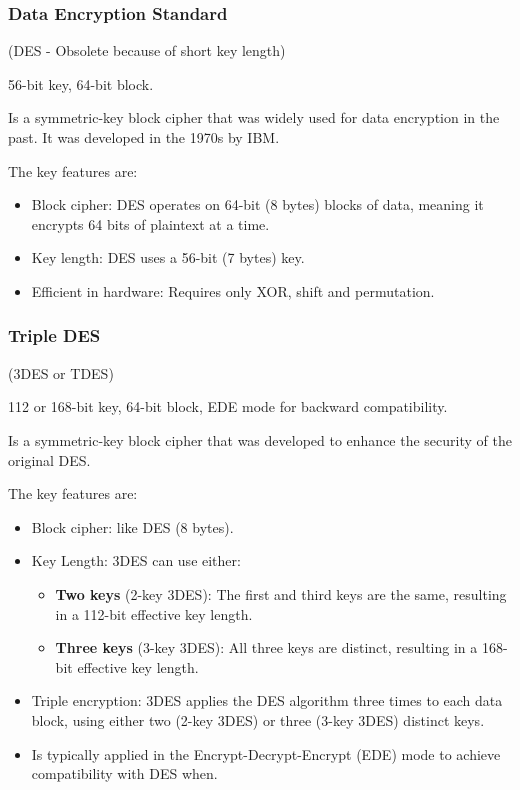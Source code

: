 \subsubsection{Data Encryption Standard}
\begin{center}
    (DES - Obsolete because of short key length)

    56-bit key, 64-bit block.
\end{center}
Is a symmetric-key block cipher that was widely used for data encryption in the past. It was developed in the 1970s by IBM.

The key features are:
\begin{itemize}
    \item Block cipher: DES operates on 64-bit (8 bytes) blocks of data, meaning it encrypts 64 bits of plaintext at a time.
    \item Key length: DES uses a 56-bit (7 bytes) key.
    \item Efficient in hardware: Requires only XOR, shift and permutation.
\end{itemize}

\subsubsection{Triple DES}
\begin{center}
    (3DES or TDES)

    112 or 168-bit key, 64-bit block, EDE mode for backward compatibility.
\end{center}

Is a symmetric-key block cipher that was developed to enhance the security of the original DES.

The key features are:
\begin{itemize}
    \item Block cipher: like DES (8 bytes).
    \item Key Length: 3DES can use either:
    \begin{itemize}
        \item \textbf{Two keys} (2-key 3DES): The first and third keys are the same, resulting in a 112-bit effective key length.
        \item \textbf{Three keys} (3-key 3DES): All three keys are distinct, resulting in a 168-bit effective key length.
    \end{itemize}
    \item Triple encryption: 3DES applies the DES algorithm three times to each data block, using either two (2-key 3DES) or three (3-key 3DES) distinct keys.
    \item Is typically applied in the Encrypt-Decrypt-Encrypt (EDE) mode to achieve compatibility with DES when.
\end{itemize}

